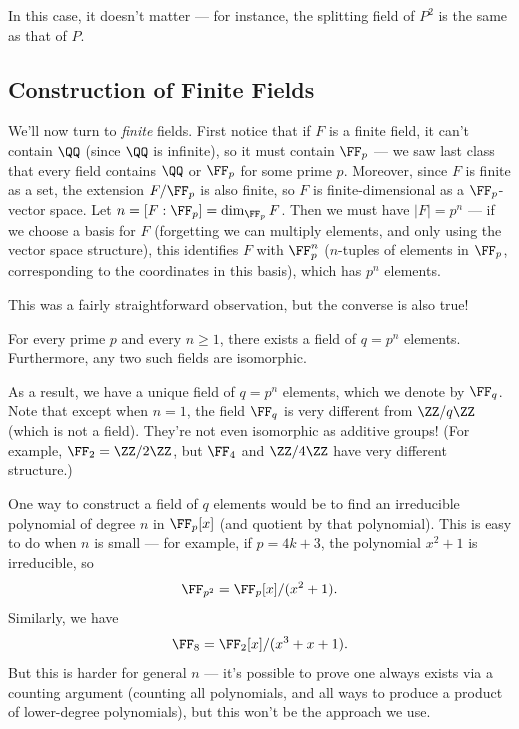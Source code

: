 \begin{ans}
In this case, it doesn't matter --- for instance, the splitting field of $P^2$ is the same as that of $P$. 
\end{ans}

\subsection{Construction of Finite Fields}

We'll now turn to \emph{finite} fields. First notice that if $F$ is a finite field, it can't contain $\QQ$ (since $\QQ$ is infinite), so it must contain $\FF_p$ --- we saw last class that every field contains $\QQ$ or $\FF_p$ for some prime $p$. Moreover, since $F$ is finite as a set, the extension $F/\FF_p$ is also finite, so $F$ is finite-dimensional as a $\FF_p$-vector space. Let $n = [F : \FF_p] = \dim_{\FF_p} F$. Then we must have $|F| = p^n$ --- if we choose a basis for $F$ (forgetting we can multiply elements, and only using the vector space structure), this identifies $F$ with $\FF_p^n$ ($n$-tuples of elements in $\FF_p$, corresponding to the coordinates in this basis), which has $p^n$ elements. 



This was a fairly straightforward observation, but the converse is also true!

\begin{theorem}\label{finite fields}
For every prime $p$ and every $n \geq 1$, there exists a field of $q = p^n$ elements. Furthermore, any two such fields are isomorphic. 
\end{theorem}

As a result, we have a unique field of $q = p^n$ elements, which we denote by $\FF_q$. Note that except when $n = 1$, the field $\FF_q$ is very different from $\ZZ/q\ZZ$ (which is not a field). They're not even isomorphic as additive groups! (For example, $\FF_2 = \ZZ/2\ZZ$, but $\FF_4$ and $\ZZ/4\ZZ$ have very different structure.)

One way to construct a field of $q$ elements would be to find an irreducible polynomial of degree $n$ in $\FF_p[x]$ (and quotient by that polynomial). This is easy to do when $n$ is small --- for example, if $p = 4k + 3$, the polynomial $x^2 + 1$ is irreducible, so \[\FF_{p^2} = \FF_p[x]/(x^2 + 1).\] Similarly, we have \[\FF_8 = \FF_2[x]/(x^3 + x + 1).\] But this is harder for general $n$ --- it's possible to prove one always exists via a counting argument (counting all polynomials, and all ways to produce a product of lower-degree polynomials), but this won't be the approach we use. 

